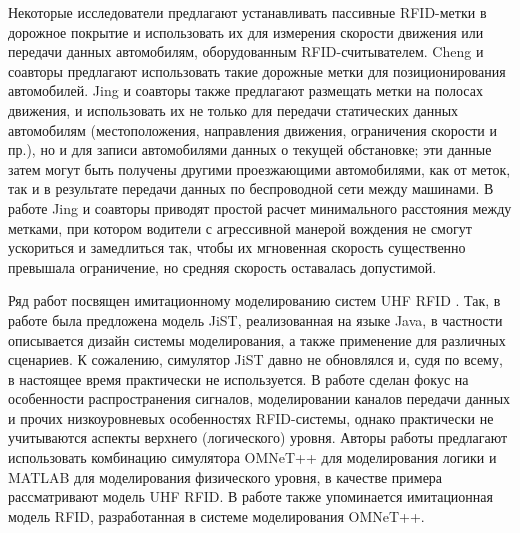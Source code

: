Некоторые исследователи предлагают устанавливать пассивные RFID-метки в дорожное покрытие и использовать их для измерения скорости движения или передачи данных автомобилям, оборудованным RFID-считывателем. Cheng и соавторы \cite{Cheng2012} предлагают использовать такие дорожные метки для позиционирования автомобилей. Jing и соавторы \cite{Jing2016} также предлагают размещать метки на полосах движения, и использовать их не только для передачи статических данных автомобилям (местоположения, направления движения, ограничения скорости и пр.), но и для записи автомобилями данных о текущей обстановке; эти данные затем могут быть получены другими проезжающими автомобилями, как от меток, так и в результате передачи данных по беспроводной сети между машинами. В работе \cite{Jing2013} Jing и соавторы приводят простой расчет минимального расстояния между метками, при котором водители с агрессивной манерой вождения не смогут ускориться и замедлиться так, чтобы их мгновенная скорость существенно превышала ограничение, но средняя скорость оставалась допустимой.

Ряд работ посвящен имитационному моделированию систем UHF RFID \cite{Floerkemeier2009, Arnitz2009, Zhang2010, Jing2016}. Так, в работе \cite{Floerkemeier2009} была предложена модель JiST, реализованная на языке Java, в частности описывается дизайн системы моделирования, а также применение для различных сценариев. К сожалению, симулятор JiST давно не обновлялся и, судя по всему, в настоящее время практически не используется. В работе \cite{Arnitz2009} сделан фокус на особенности распространения сигналов, моделировании каналов передачи данных и прочих низкоуровневых особенностях RFID-системы, однако практически не учитываются аспекты верхнего (логического) уровня. Авторы работы \cite{Zhang2010} предлагают использовать комбинацию симулятора OMNeT++ для моделирования логики и MATLAB для моделирования физического уровня, в качестве примера рассматривают модель UHF RFID. В работе \cite{Jing2016} также упоминается имитационная модель RFID, разработанная в системе моделирования OMNeT++.

